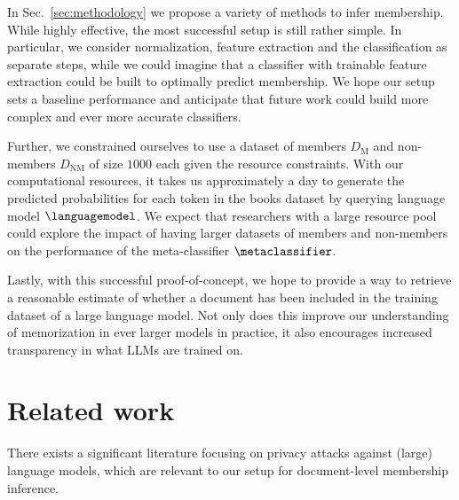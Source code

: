 \documentclass[twocolumn,10pt]{article}
\begin{document}
In Sec.~\ref{sec:methodology} we propose a variety of methods to infer membership. While highly effective, the most successful setup is still rather simple. In particular, we consider normalization, feature extraction and the classification as separate steps, while we could imagine that a classifier with trainable feature extraction could be built to optimally predict membership. We hope our setup sets a baseline performance and anticipate that future work could build more complex and ever more accurate classifiers.

Further, we constrained ourselves to use a dataset of members $D_\text{M}$ and non-members $D_\text{NM}$ of size $1000$ each given the resource constraints. With our computational resources, it takes us approximately a day to generate the predicted probabilities for each token in the books dataset by querying language model $\languagemodel$. We expect that researchers with a large resource pool could explore the impact of having larger datasets of members and non-members on the performance of the meta-classifier $\metaclassifier$.

Lastly, with this successful proof-of-concept, we hope to provide a way to retrieve a reasonable estimate of whether a document has been included in the training dataset of a large language model. Not only does this improve our understanding of memorization in ever larger models in practice, it also encourages increased transparency in what LLMs are trained on.

 

\section{Related work}
There exists a significant literature focusing on privacy attacks against (large) language models, which are relevant to our setup for document-level membership inference. 
\end{document}

